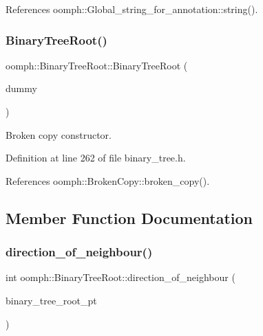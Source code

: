 References oomph\+::\+Global\+\_\+string\+\_\+for\+\_\+annotation\+::string().

\mbox{\label{classoomph_1_1BinaryTreeRoot_adadf7a81e693afcc94ee2ac1446730f0}} 
\subsubsection{\texorpdfstring{Binary\+Tree\+Root()}{BinaryTreeRoot()}\hspace{0.1cm}{\footnotesize\ttfamily [2/2]}}
{\footnotesize\ttfamily oomph\+::\+Binary\+Tree\+Root\+::\+Binary\+Tree\+Root (\begin{DoxyParamCaption}\item[{const \hyperlink{classoomph_1_1BinaryTreeRoot}{Binary\+Tree\+Root} \&}]{dummy }\end{DoxyParamCaption})\hspace{0.3cm}{\ttfamily [inline]}}



Broken copy constructor. 



Definition at line 262 of file binary\+\_\+tree.\+h.



References oomph\+::\+Broken\+Copy\+::broken\+\_\+copy().



\subsection{Member Function Documentation}
\mbox{\label{classoomph_1_1BinaryTreeRoot_a2068dd13b3a8636bbcde996e39dc7d1c}} 
\subsubsection{\texorpdfstring{direction\+\_\+of\+\_\+neighbour()}{direction\_of\_neighbour()}}
{\footnotesize\ttfamily int oomph\+::\+Binary\+Tree\+Root\+::direction\+\_\+of\+\_\+neighbour (\begin{DoxyParamCaption}\item[{\hyperlink{classoomph_1_1BinaryTreeRoot}{Binary\+Tree\+Root} $\ast$}]{binary\+\_\+tree\+\_\+root\+\_\+pt }\end{DoxyParamCaption})\hspace{0.3cm}{\ttfamily [inline]}}



